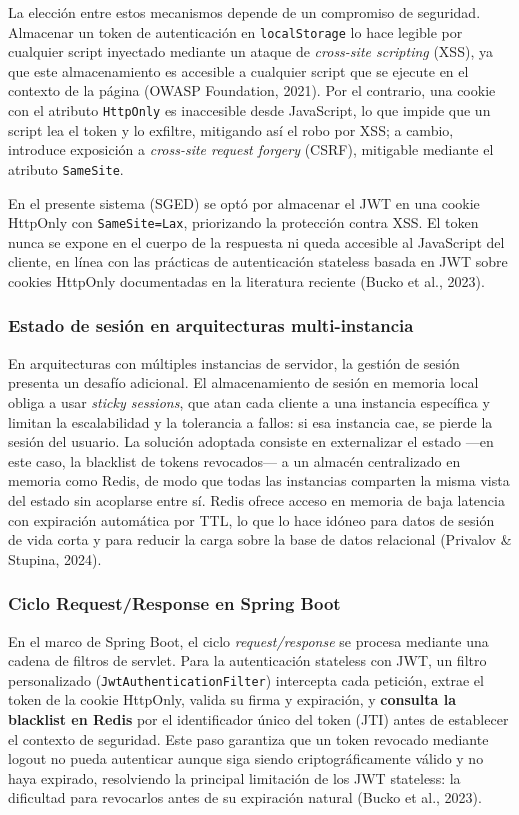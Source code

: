 \documentclass[12pt]{article}
\begin{document}
	La elección entre estos mecanismos depende de un compromiso de seguridad. Almacenar un token de autenticación en \texttt{localStorage} lo hace legible por cualquier script inyectado mediante un ataque de \textit{cross-site scripting} (XSS), ya que este almacenamiento es accesible a cualquier script que se ejecute en el contexto de la página (OWASP Foundation, 2021). Por el contrario, una cookie con el atributo \texttt{HttpOnly} es inaccesible desde JavaScript, lo que impide que un script lea el token y lo exfiltre, mitigando así el robo por XSS; a cambio, introduce exposición a \textit{cross-site request forgery} (CSRF), mitigable mediante el atributo \texttt{SameSite}.
	
	En el presente sistema (SGED) se optó por almacenar el JWT en una cookie HttpOnly con \texttt{SameSite=Lax}, priorizando la protección contra XSS. El token nunca se expone en el cuerpo de la respuesta ni queda accesible al JavaScript del cliente, en línea con las prácticas de autenticación stateless basada en JWT sobre cookies HttpOnly documentadas en la literatura reciente (Bucko et al., 2023).
	
	\subsubsection*{Estado de sesión en arquitecturas multi-instancia}
	
	En arquitecturas con múltiples instancias de servidor, la gestión de sesión presenta un desafío adicional. El almacenamiento de sesión en memoria local obliga a usar \textit{sticky sessions}, que atan cada cliente a una instancia específica y limitan la escalabilidad y la tolerancia a fallos: si esa instancia cae, se pierde la sesión del usuario. La solución adoptada consiste en externalizar el estado —en este caso, la blacklist de tokens revocados— a un almacén centralizado en memoria como Redis, de modo que todas las instancias comparten la misma vista del estado sin acoplarse entre sí. Redis ofrece acceso en memoria de baja latencia con expiración automática por TTL, lo que lo hace idóneo para datos de sesión de vida corta y para reducir la carga sobre la base de datos relacional (Privalov \& Stupina, 2024).
	
	\subsubsection*{Ciclo Request/Response en Spring Boot}
	
	En el marco de Spring Boot, el ciclo \textit{request/response} se procesa mediante una cadena de filtros de servlet. Para la autenticación stateless con JWT, un filtro personalizado (\texttt{JwtAuthenticationFilter}) intercepta cada petición, extrae el token de la cookie HttpOnly, valida su firma y expiración, y \textbf{consulta la blacklist en Redis} por el identificador único del token (JTI) antes de establecer el contexto de seguridad. Este paso garantiza que un token revocado mediante logout no pueda autenticar aunque siga siendo criptográficamente válido y no haya expirado, resolviendo la principal limitación de los JWT stateless: la dificultad para revocarlos antes de su expiración natural (Bucko et al., 2023).
	
\end{document}
